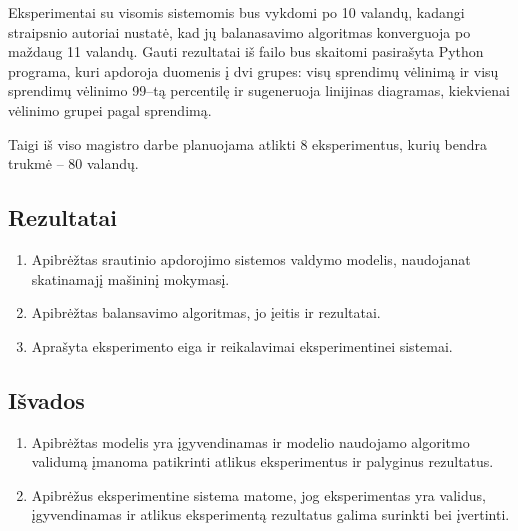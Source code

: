\documentclass{VUMIFPSbakalaurinis}
\begin{document}
Eksperimentai su visomis sistemomis bus vykdomi po 10 valandų, kadangi \cite{vaquero2018autotuning} straipsnio autoriai nustatė, kad jų balanasavimo algoritmas konverguoja po maždaug 11 valandų. 
Gauti rezultatai iš failo bus skaitomi pasirašyta Python programa, kuri apdoroja duomenis į dvi grupes: visų sprendimų vėlinimą ir visų sprendimų vėlinimo 99–tą percentilę ir sugeneruoja linijinas diagramas, kiekvienai vėlinimo grupei pagal sprendimą.

Taigi iš viso magistro darbe planuojama atlikti 8 eksperimentus, kurių bendra trukmė – 80 valandų.



\subsection*{Rezultatai}
\begin{enumerate}
    \item Apibrėžtas srautinio apdorojimo sistemos valdymo modelis, naudojanat skatinamajį mašininį mokymasį. 
    \item Apibrėžtas balansavimo algoritmas, jo įeitis ir rezultatai.
    \item Aprašyta eksperimento eiga ir reikalavimai eksperimentinei sistemai.
\end{enumerate}
\subsection*{Išvados}
\begin{enumerate}
    \item Apibrėžtas modelis yra įgyvendinamas ir modelio naudojamo algoritmo validumą įmanoma patikrinti atlikus eksperimentus ir palyginus rezultatus.
    \item Apibrėžus eksperimentine sistema matome, jog eksperimentas yra validus, įgyvendinamas ir atlikus eksperimentą rezultatus galima surinkti bei įvertinti.
\end{enumerate}
\printbibliography[heading=bibintoc] 
\end{document}
